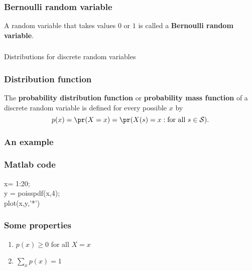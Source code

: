 \begin{frame}[fragile]\frametitle{Bernoulli random variable}

\begin{defn}
A random variable that takes values $0$ or $1$ is called a {\bf
  Bernoulli random variable}.
\end{defn} 


\end{frame}


\begin{frame}[fragile]\frametitle{}
\begin{center}
{\Large Distributions for discrete random variables}

\end{center}
\end{frame}



\begin{frame}[fragile]\frametitle{Distribution function}

\begin{defn}
The {\bf probability distribution function} or {\bf probability
mass function} of a discrete random variable is defined for
every possible $x$ by
$$p(x) = \pr(X=x) = \pr(X(s) = x: \mbox{for all } s \in {\cal S}).$$
\end{defn} 

\end{frame}


\begin{frame}[fragile]\frametitle{An example}


\end{frame}



\begin{frame}[fragile]\frametitle{Matlab code}



x= 1:20; \\
y = poisspdf(x,4); \\
plot(x,y,'*') \\

\end{frame}




\begin{frame}[fragile]\frametitle{Some properties}


\begin{enumerate}

\item $p(x) \geq 0$ for all $X=x$ 

\item $\sum_x p(x) =1$

\end{enumerate}

\end{frame}



